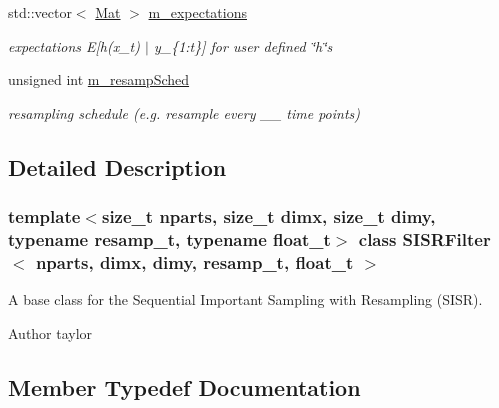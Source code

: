 \begin{DoxyCompactItemize}
\mbox{\label{classSISRFilter_acb5ed65aeed970afb929c108d04ee0d1}} 
std\+::vector$<$ \hyperlink{classSISRFilter_a7355e966778c788dfe227ef5254677c4}{Mat} $>$ \hyperlink{classSISRFilter_acb5ed65aeed970afb929c108d04ee0d1}{m\+\_\+expectations}
\begin{DoxyCompactList}\small\item\em expectations E\mbox{[}h(x\+\_\+t) $\vert$ y\+\_\+\{1\+:t\}\mbox{]} for user defined \char`\"{}h\char`\"{}s \end{DoxyCompactList}\item 
\mbox{\label{classSISRFilter_a196049324b4c6c42a927d83f659619aa}} 
unsigned int \hyperlink{classSISRFilter_a196049324b4c6c42a927d83f659619aa}{m\+\_\+resamp\+Sched}
\begin{DoxyCompactList}\small\item\em resampling schedule (e.\+g. resample every \+\_\+\+\_\+ time points) \end{DoxyCompactList}\end{DoxyCompactItemize}


\subsection{Detailed Description}
\subsubsection*{template$<$size\+\_\+t nparts, size\+\_\+t dimx, size\+\_\+t dimy, typename resamp\+\_\+t, typename float\+\_\+t$>$\newline
class S\+I\+S\+R\+Filter$<$ nparts, dimx, dimy, resamp\+\_\+t, float\+\_\+t $>$}

A base class for the Sequential Important Sampling with Resampling (S\+I\+SR). 

\begin{DoxyAuthor}{Author}
taylor 
\end{DoxyAuthor}


\subsection{Member Typedef Documentation}
\mbox{\label{classSISRFilter_a35f5a590324bd78fc4f6ded236937ac2}} 
